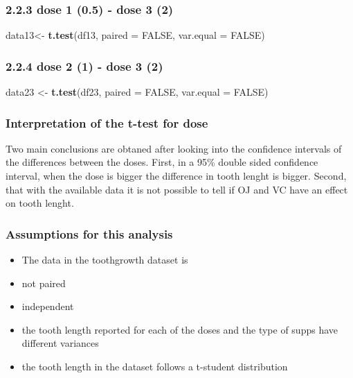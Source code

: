 \documentclass[]{article}
\newenvironment{Shaded}{\begin{snugshade}}{\end{snugshade}}
\newcommand{\DataTypeTok}[1]{\textcolor[rgb]{0.13,0.29,0.53}{#1}}
\newcommand{\KeywordTok}[1]{\textcolor[rgb]{0.13,0.29,0.53}{\textbf{#1}}}
\newcommand{\NormalTok}[1]{#1}
\newcommand{\OtherTok}[1]{\textcolor[rgb]{0.56,0.35,0.01}{#1}}
\newcommand{\StringTok}[1]{\textcolor[rgb]{0.31,0.60,0.02}{#1}}
\providecommand{\tightlist}{%
  \setlength{\itemsep}{0pt}\setlength{\parskip}{0pt}}
\begin{document}
\hypertarget{dose-1-0.5---dose-3-2}{%
\subsubsection{2.2.3 dose 1 (0.5) - dose 3
(2)}\label{dose-1-0.5---dose-3-2}}

\begin{Shaded}
\begin{Highlighting}[]
\NormalTok{data13<-}\StringTok{ }\KeywordTok{t.test}\NormalTok{(df13, }\DataTypeTok{paired =} \OtherTok{FALSE}\NormalTok{, }\DataTypeTok{var.equal =} \OtherTok{FALSE}\NormalTok{)}
\end{Highlighting}
\end{Shaded}

\hypertarget{dose-2-1---dose-3-2}{%
\subsubsection{2.2.4 dose 2 (1) - dose 3
(2)}\label{dose-2-1---dose-3-2}}

\begin{Shaded}
\begin{Highlighting}[]
\NormalTok{data23 <-}\StringTok{ }\KeywordTok{t.test}\NormalTok{(df23, }\DataTypeTok{paired =} \OtherTok{FALSE}\NormalTok{, }\DataTypeTok{var.equal =} \OtherTok{FALSE}\NormalTok{)}
\end{Highlighting}
\end{Shaded}

\hypertarget{interpretation-of-the-t-test-for-dose}{%
\subsubsection{Interpretation of the t-test for
dose}\label{interpretation-of-the-t-test-for-dose}}

Two main conclusions are obtaned after looking into the confidence
intervals of the differences between the doses. First, in a 95\% double
sided confidence interval, when the dose is bigger the difference in
tooth lenght is bigger. Second, that with the available data it is not
possible to tell if OJ and VC have an effect on tooth lenght.

\hypertarget{assumptions-for-this-analysis}{%
\subsubsection{Assumptions for this
analysis}\label{assumptions-for-this-analysis}}

\begin{itemize}
\tightlist
\item
  The data in the toothgrowth dataset is
\item
  not paired
\item
  independent
\item
  the tooth length reported for each of the doses and the type of supps
  have different variances
\item
  the tooth length in the dataset follows a t-student distribution
\end{itemize}
\end{document}
